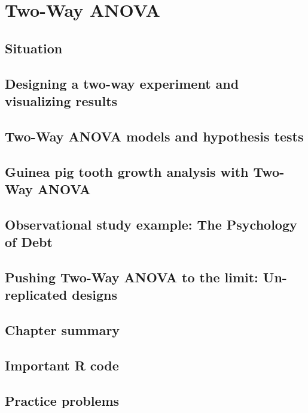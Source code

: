 \documentclass[]{book}
\begin{document}
{{\chapter{Two-Way ANOVA}\label{chapter4}

\section{Situation}\label{section4-1}

\section{Designing a two-way experiment and visualizing
results}\label{section4-2}

\section{Two-Way ANOVA models and hypothesis tests}\label{section4-3}

\section{Guinea pig tooth growth analysis with Two-Way
ANOVA}\label{section4-4}

\section{Observational study example: The Psychology of
Debt}\label{section4-5}

\section{Pushing Two-Way ANOVA to the limit: Un-replicated
designs}\label{section4-6}

\section{Chapter summary}\label{section4-7}

\section{Important R code}\label{section4-8}

\section{Practice problems}\label{section4-9}

}}
\end{document}
